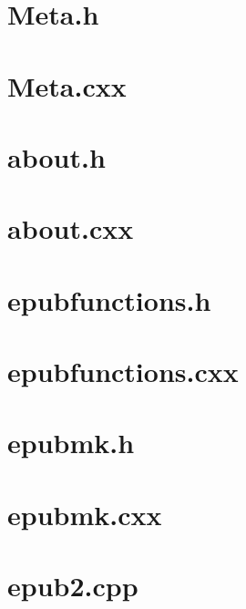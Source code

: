 \documentclass[11pt]{article} %
\begin{document}
\section*{Meta.h}
\label{app:code1}
\scriptsize

\section*{Meta.cxx}
\label{app:code2}
\scriptsize

\section*{about.h}
\label{app:code3}
\scriptsize

\section*{about.cxx}
\label{app:code4}
\scriptsize

\section*{epubfunctions.h}
\label{app:code5}
\scriptsize

\section*{epubfunctions.cxx}
\label{app:code6}
\scriptsize

\section*{epubmk.h}
\label{app:code7}
\scriptsize

\section*{epubmk.cxx}
\label{app:code8}
\scriptsize

\section*{epub2.cpp}
\label{app:code9}
\scriptsize
\end{document}
